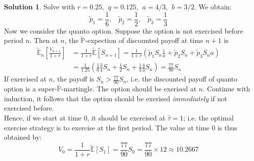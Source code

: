 \documentclass[a4paper, 10pt]{article}
\theoremstyle{definition}
\theoremstyle{hSol}
\newtheorem*{solution}{Solution}
\begin{document}
\begin{solution}
Solve with $r=0.25,~~q=0.125,~~a=4/3,~~b=3/2$. We obtain:
\begin{equation}
  \tilde{p}_1 = \frac{1}{6},~~~~\tilde{p}_2 = \frac{1}{2},~~~~\tilde{p}_3 = \frac{1}{3}
\end{equation}
Now we consider the quanto option. Suppose the option is not exercised before period $n$. Then at $n$, the $\tilde{\mathbb{P}}$-expection of discounted payoff at time $n+1$ is
\begin{equation}
  \begin{split}
    \tilde{\mathbb{E}}_n\left[\frac{V_{n+1}}{1+r}\right] &= \frac{1}{1+r} \tilde{\mathbb{E}}\left[S_{n+1}\right] =\frac{1}{1+r}(\tilde{p}_1S_n\tfrac{1}{a}+\tilde{p}_2S_n+\tilde{p}_3S_n a) \\
    &= \frac{1}{1.25}\left(\frac{1}{6}\frac{3}{4}S_n+\frac{1}{2}S_n + \frac{1}{3}\frac{4}{3}S_n\right) = \frac{77}{90}S_n
  \end{split}
\end{equation}
If exercised at $n$, the payoff is $S_n > \frac{77}{90}S_n$, i.e. the discounted payoff of quanto option is a super-$\tilde{\mathbb{P}}$-martingle. The option should be exerised at $n$. Continue with induction, it follows that the option should be exerised \textit{immediately} if not exercised before.\\
Hence, if we start at time 0, it should be exercised at $\hat{\tau}=1$; i.e. the optimal exercise strategy is to exercise at the first period. The value at time 0 is thus obtained by:
\begin{equation}
  V_0 = \frac{1}{1+r}\tilde{\mathbb{E}}\left[S_1\right] = \frac{77}{90}S_0 = \frac{77}{90}\times 12 \approx 10.2667
\end{equation}
\end{solution}
\end{document}
